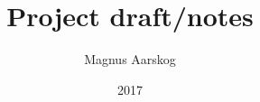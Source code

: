 \documentclass[10pt,b5paper,twoside,openright]{book}
\begin{document}
\pagestyle{plain}

\title{Project draft/notes}
\author{Magnus Aarskog}
\date{2017}



\maketitle
\pagestyle{headings}






\backmatter
{}

\end{document}
